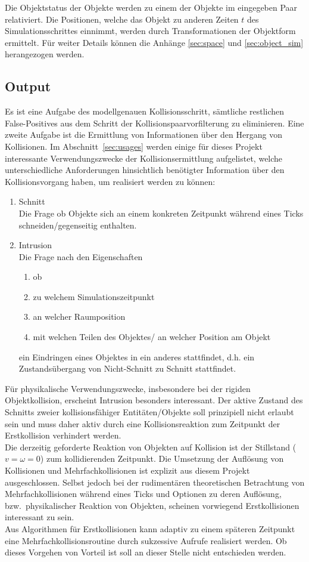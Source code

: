 Die Objektstatus der Objekte werden zu einem der Objekte im eingegeben Paar relativiert.  Die Positionen, welche das Objekt zu anderen Zeiten $t$ des Simulationsschrittes einnimmt, werden durch Transformationen der Objektform ermittelt. Für weiter Details können die Anhänge \ref{sec:space} und \ref{sec:object_sim} herangezogen werden.\\

\subsection{Output}
Es ist eine Aufgabe des modellgenauen Kollisionsschritt, sämtliche restlichen False-Positives aus dem Schritt der Kollisionspaarvorfilterung zu eliminieren.
Eine zweite Aufgabe ist die Ermittlung von Informationen über den Hergang von Kollisionen.
Im Abschnitt~\ref{sec:usages} werden einige für dieses Projekt interessante Verwendungszwecke der Kollisionsermittlung aufgelistet, welche unterschiedliche Anforderungen hinsichtlich benötigter Information über den Kollisionsvorgang haben, um realisiert werden zu können:
\begin{enumerate}
	\item Schnitt\\
		Die Frage ob Objekte sich an einem konkreten Zeitpunkt während eines Ticks schneiden/gegenseitig enthalten.
	\item Intrusion\\
		Die Frage nach den Eigenschaften
		\begin{enumerate}
		\item ob
		\item zu welchem Simulationszeitpunkt
		\item an welcher Raumposition
		\item mit welchen Teilen des Objektes/ an welcher Position am Objekt
		\end{enumerate}
		ein Eindringen eines Objektes in ein anderes stattfindet, d.h. ein Zustandsübergang von Nicht-Schnitt zu Schnitt stattfindet.
\end{enumerate}
Für physikalische Verwendungszwecke, insbesondere bei der rigiden Objektkollision, erscheint Intrusion besonders interessant. Der aktive Zustand des Schnitts zweier kollisionsfähiger Entitäten/Objekte soll prinzipiell nicht erlaubt sein und muss daher aktiv durch eine Kollisionsreaktion zum Zeitpunkt der Erstkollision verhindert werden.\\
Die derzeitig geforderte Reaktion von Objekten auf Kollision ist der Stillstand ($v = \omega = 0$) zum kollidierenden Zeitpunkt. Die Umsetzung der Auflösung von Kollisionen und Mehrfachkollisionen ist explizit aus diesem Projekt ausgeschlossen. Selbst jedoch bei der rudimentären theoretischen Betrachtung von Mehrfachkollisionen während eines Ticks und Optionen zu deren Auflösung, bzw.~physikalischer Reaktion von Objekten, scheinen vorwiegend Erstkollisionen interessant zu sein.\\
Aus Algorithmen für Erstkollisionen kann adaptiv zu einem späteren Zeitpunkt eine Mehrfachkollisionsroutine durch sukzessive Aufrufe realisiert werden. Ob dieses Vorgehen von Vorteil ist soll an dieser Stelle nicht entschieden werden.

